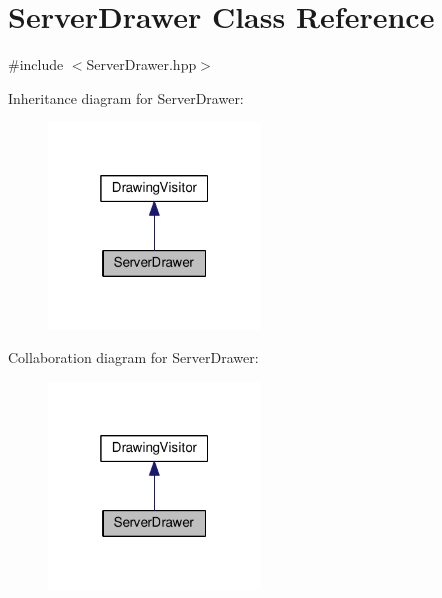 \hypertarget{class_server_drawer}{}\section{Server\+Drawer Class Reference}
\label{class_server_drawer}


{\ttfamily \#include $<$Server\+Drawer.\+hpp$>$}



Inheritance diagram for Server\+Drawer\+:\nopagebreak
\begin{figure}[H]
\begin{center}
\leavevmode
\includegraphics[width=160pt]{class_server_drawer__inherit__graph}
\end{center}
\end{figure}


Collaboration diagram for Server\+Drawer\+:\nopagebreak
\begin{figure}[H]
\begin{center}
\leavevmode
\includegraphics[width=160pt]{class_server_drawer__coll__graph}
\end{center}
\end{figure}
